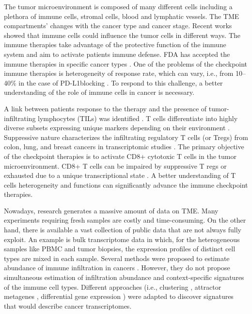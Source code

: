 \documentclass[12pt,]{book}
\theoremstyle{definition}
\theoremstyle{definition}
\theoremstyle{definition}
\theoremstyle{remark}
\begin{document}
The tumor microenvironment is composed of many different cells including
a plethora of immune cells, stromal cells, blood and lymphatic
vessels\citep{Galon2014}. The TME compartments' changes with the cancer
type and cancer stage. Recent works showed that immune cells could
influence the tumor cells in different ways. The immune therapies take
advantage of the protective function of the immune system and aim to
activate patients immune defense. FDA has accepted the immune therapies
in specific cancer types \citep{Taube2017a}. One of the problems of the
checkpoint immune therapies is heterogeneity of response rate, which can
vary, i.e., from 10--40\% in the case of PD-L1blocking \citep{Zou2016}.
To respond to this challenge, a better understanding of the role of
immune cells in cancer is necessary.

A link between patients response to the therapy and the presence of
tumor-infiltrating lymphocytes (TILs) was identified
\citep{Topalian2016}. T cells differentiate into highly diverse subsets
expressing unique markers depending on their environment
\citep{Wong2016}. Suppressive nature characterizes the infiltrating
regulatory T cells (or Tregs) from colon, lung, and breast cancers in
transcriptomic studies \citep{DeSimone2016, Plitas2016}. The primary
objective of the checkpoint therapies is to activate CD8+ cytotoxic T
cells in the tumor microenvironment. CD8+ T cells can be impaired by
suppressive T regs or exhausted due to a unique transcriptional state
\citep{Chen2017}. A better understanding of T cells heterogeneity and
functions can significantly advance the immune checkpoint therapies.

Nowadays, research generates a massive amount of data on TME. Many
experiments requiring fresh samples are costly and time-consuming. On
the other hand, there is available a vast collection of public data that
are not always fully exploit. An example is bulk transcriptome data in
which, for the heterogeneous samples like PBMC and tumor biopsies, the
expression profiles of distinct cell types are mixed in each sample.
Several methods were proposed to estimate abundance of immune
infiltration in cancers
\citep{Becht2016, Newman2015, Aran2017, Racle2017}. However, they do not
propose simultaneous estimation of infiltration abundance and
context-specific signatures of the immune cell types. Different
approaches (i.e., clustering \citep{Chifman2016}, attractor metagenes
\citep{Cheng2013}, differential gene expression \citep{Cieslik2017})
were adapted to discover signatures that would describe cancer
transcriptomes.
\end{document}
